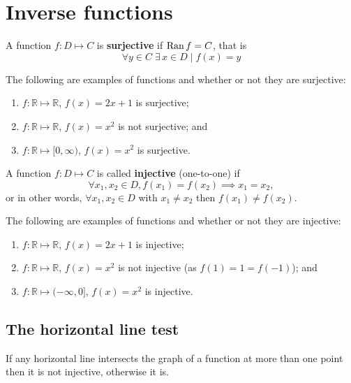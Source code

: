\section{Inverse functions}

\begin{definition}
    A function $f:D\mapsto C$ is \textbf{surjective} if $\operatorname{Ran}{f}=C$, that is \[\forall y\in C\;\exists\,x\in D\mid f(x)=y\]
\end{definition}

\begin{example}
    The following are examples of functions and whether or not they are surjective:
    \begin{enumerate}
        \item $f:\mathbb R\mapsto\mathbb R$, $f(x)=2x+1$ is surjective;
        \item $f:\mathbb R\mapsto\mathbb R$, $f(x)=x^2$ is not surjective; and
        \item $f:\mathbb R\mapsto[0,\infty)$, $f(x)=x^2$ is surjective.
    \end{enumerate}
\end{example}

\begin{definition}
    A function $f:D\mapsto C$ is called \textbf{injective} (one-to-one) if \[\forall x_1,x_2\in D, f(x_1)=f(x_2)\implies x_1=x_2,\] or in other words, $\forall x_1,x_2\in D$ with $x_1\neq x_2$ then $f(x_1)\neq f(x_2)$.
\end{definition}

\begin{example}
The following are examples of functions and whether or not they are injective:
    \begin{enumerate}
        \item $f:\mathbb R\mapsto\mathbb R$, $f(x)=2x+1$ is injective;
        \item $f:\mathbb R\mapsto\mathbb R$, $f(x)=x^2$ is not injective (as $f(1)=1=f(-1)$); and
        \item $f:\mathbb R\mapsto(-\infty,0]$, $f(x)=x^2$ is injective.
    \end{enumerate}
\end{example}

\subsection{The horizontal line test}

If any horizontal line intersects the graph of a function at more than one point then it is not injective, otherwise it is.

